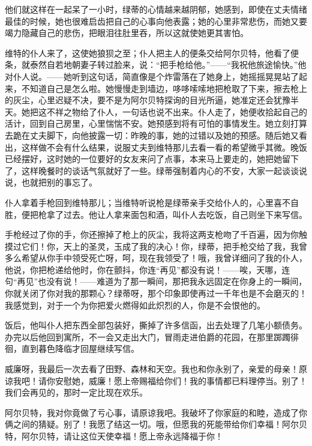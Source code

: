 \documentclass[12pt,oneside]{book}
\begin{document}
\begin{framed}
他们就这样在一起呆了一小时，绿蒂的心情越来越阴郁，她感到，即使在丈夫情绪最佳的时候，她也很难启齿把自己的心事向他表露；她的心里非常悲伤，而她又要竭力隐藏自己的悲伤，把眼泪往肚里吞，所以这就使她更其害怕。

维特的仆人来了，这使她狼狈之至；仆人把主人的便条交给阿尔贝特，他看了便条，就泰然自若地朝妻子转过脸来，说：“把手枪给他。”——“我祝他旅途愉快。”他对仆人说。——她听到这句话，简直像是个炸雷落在了她身上，她摇摇晃晃站了起来，不知道自己是怎么啦。她慢慢走到墙边，哆哆嗦嗦地把枪取了下来，擦去枪上的灰尘，心里迟疑不决，要不是为阿尔贝特探询的目光所逼，她准定还会犹豫半天。她把这不祥之物给了仆人，一句话也说不出来。仆人走了，她便收拾起自己的活计，回到自己房里，心里惴惴不安。她预感到将有可怕的事情发生。她立刻打算去跪在丈夫脚下，向他披露一切：昨晚的事，她的过错以及她的预感。随后她又看出，这样做不会有什么结果，说服丈夫到维特那儿去看一看的希望微乎其微。晚饭已经摆好，这时她的一位要好的女友来问了点事，本来马上要走的，她把她留下了，这样晚餐时的谈话气氛就好了一些。绿蒂强制着内心的不安，大家一起谈谈说说，也就把别的事忘了。

仆人拿着手枪回到维特那儿；当维特听说枪是绿蒂亲手交给仆人的，心里喜不自胜，便把枪拿了过去。他让人拿来面包和酒，叫仆人去吃饭，自己则坐下来写信。
\end{framed}

手枪经过了你的手，你还擦掉了枪上的灰尘，我将这两支枪吻了千百遍，因为你触摸过它们！你，天上的圣灵，玉成了我的决心！你，绿蒂，把手枪交给了我，我曾多么希望从你手中领受死亡呀，呵，现在我领受了！哦，我曾详细问了我的仆人，他说，你把枪递给他时，你在颤抖，你连“再见”都没有说！——唉，天哪，连句“再见”也没有说！——难道为了那一瞬间，那把我永远固定在你身上的一瞬间，你就关闭了你对我的那颗心？绿蒂呀，那个印象即使再过一千年也是不会磨灭的！我感觉到，对于一个为你把爱火燃得如此炽烈的人，你是不会恨他的。

\begin{framed}
饭后，他叫仆人把东西全部包装好，撕掉了许多信函，出去处理了几笔小额债务。办完以后他回到寓所，不一会又走出大门，冒雨走进伯爵的花园，在那里踯躅徘徊，直到暮色降临才回屋继续写信。
\end{framed}

威廉呀，我最后一次去看了田野、森林和天空。我也和你永别了，亲爱的母亲！原谅我吧！请你安慰她，威廉！愿上帝赐福给你们！我的事情都已料理停当。别了！我们会再见的，那时一定比现在欢乐。

阿尔贝特，我对你竟做了亏心事，请原谅我吧。我破坏了你家庭的和睦，造成了你俩之间的猜疑。别了！我愿了结这一切。哦，但愿我的死能带给你们幸福！阿尔贝特，阿尔贝特，请让这位天使幸福！愿上帝永远降福于你！
\end{document}
